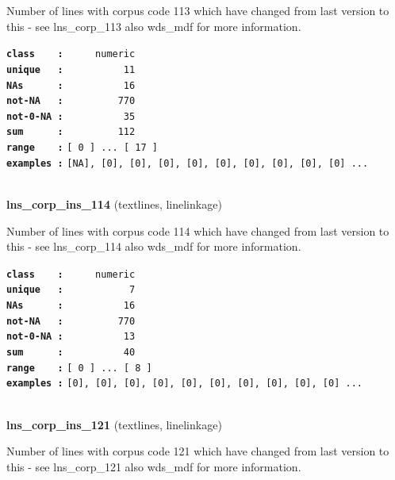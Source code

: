 \documentclass[]{article}
\begin{document}
Number of lines with corpus code 113 which have changed from last
version to this - see lns\_corp\_113 also wds\_mdf for more information.

\textbf{\texttt{class\ \ \ \ :}} \texttt{~~~~~numeric}\\
\textbf{\texttt{unique\ \ \ :}} \texttt{~~~~~~~~~~11}\\
\textbf{\texttt{NAs\ \ \ \ \ \ :}} \texttt{~~~~~~~~~~16}\\
\textbf{\texttt{not-NA\ \ \ :}} \texttt{~~~~~~~~~770}\\
\textbf{\texttt{not-0-NA\ :}} \texttt{~~~~~~~~~~35}\\
\textbf{\texttt{sum\ \ \ \ \ \ :}} \texttt{~~~~~~~~~112}\\
\textbf{\texttt{range\ \ \ \ :}}
\texttt{{[}\ 0\ {]}\ ...\ {[}\ 17\ {]}}\\
\textbf{\texttt{examples\ :}}
\texttt{{[}NA{]},\ {[}0{]},\ {[}0{]},\ {[}0{]},\ {[}0{]},\ {[}0{]},\ {[}0{]},\ {[}0{]},\ {[}0{]},\ {[}0{]}\ ...}\\

~

\textbf{lns\_corp\_ins\_114} (textlines, linelinkage)

Number of lines with corpus code 114 which have changed from last
version to this - see lns\_corp\_114 also wds\_mdf for more information.

\textbf{\texttt{class\ \ \ \ :}} \texttt{~~~~~numeric}\\
\textbf{\texttt{unique\ \ \ :}} \texttt{~~~~~~~~~~~7}\\
\textbf{\texttt{NAs\ \ \ \ \ \ :}} \texttt{~~~~~~~~~~16}\\
\textbf{\texttt{not-NA\ \ \ :}} \texttt{~~~~~~~~~770}\\
\textbf{\texttt{not-0-NA\ :}} \texttt{~~~~~~~~~~13}\\
\textbf{\texttt{sum\ \ \ \ \ \ :}} \texttt{~~~~~~~~~~40}\\
\textbf{\texttt{range\ \ \ \ :}}
\texttt{{[}\ 0\ {]}\ ...\ {[}\ 8\ {]}}\\
\textbf{\texttt{examples\ :}}
\texttt{{[}0{]},\ {[}0{]},\ {[}0{]},\ {[}0{]},\ {[}0{]},\ {[}0{]},\ {[}0{]},\ {[}0{]},\ {[}0{]},\ {[}0{]}\ ...}\\

~

\textbf{lns\_corp\_ins\_121} (textlines, linelinkage)

Number of lines with corpus code 121 which have changed from last
version to this - see lns\_corp\_121 also wds\_mdf for more information.
\end{document}
